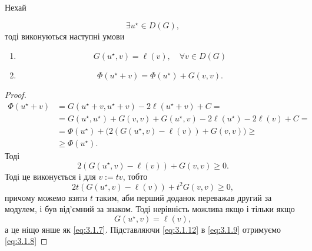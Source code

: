 \begin{theorem}
    Нехай
    \item \begin{equation}
        \exists u^\star \in D(G),
        \label{eq:3.1.6}
    \end{equation}
    тоді виконуються наступні умови
    \begin{enumerate}
        \item \begin{equation}
            \label{eq:3.1.7}
            G(u^\star, v) = \ell(v), \quad \forall v \in D(G)
        \end{equation}
        \item \begin{equation}
            \label{eq:3.1.8}
            \Phi(u^\star + v) = \Phi(u^\star) + G(v, v).
        \end{equation}
    \end{enumerate}
\end{theorem}
\begin{proof}
    \begin{equation}
        \label{eq:3.1.9}
        \begin{aligned}
            \Phi(u^\star + v) 
            &= G(u^\star + v, u^\star + v) - 2 \ell(u^\star + v) + C = \\
            &= G(u^\star, u^\star) + G(v, v) + G(u^\star, v) - 2 \ell(u^\star) - 2 \ell(v) + C = \\
            &= \Phi(u^\star) + \Big( 2 (G(u^\star, v) - \ell(v)) + G(v, v) \Big) \ge  \\
            &\ge \Phi(u^\star).
        \end{aligned}
    \end{equation}
    Тоді
    \begin{equation}
        \label{eq:3.1.10}
        2 (G(u^\star, v) - \ell(v)) + G(v, v) \ge 0.
    \end{equation}
    Тоді це виконується і для $v := t v$, тобто
    \begin{equation}
        \label{eq:3.1.11}
        2 t (G(u^\star, v) - \ell(v)) + t^2 G(v, v) \ge 0,
    \end{equation}
    причому можемо взяти $t$ таким, аби перший доданок переважав другий за модулем, і був від'ємний за знаком. Тоді нерівність можлива якщо і тільки якщо
    \begin{equation}
        \label{eq:3.1.12}
        G(u^\star, v) = \ell(v),
    \end{equation}
    а це ніщо янше як \eqref{eq:3.1.7}. Підставляючи \eqref{eq:3.1.12} в \eqref{eq:3.1.9} отримуємо \eqref{eq:3.1.8}
\end{proof}

